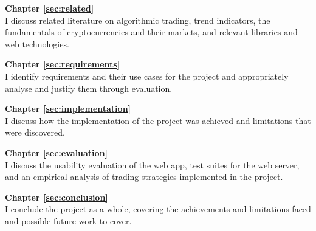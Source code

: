 \noindent\textbf{Chapter \ref{sec:related}} \\[0.2em]
I discuss related literature on algorithmic trading, trend indicators, the fundamentals of cryptocurrencies and their markets, and relevant libraries and web technologies.

\noindent\textbf{Chapter \ref{sec:requirements}} \\[0.2em]
I identify requirements and their use cases for the project and appropriately analyse and justify them through evaluation.

\noindent\textbf{Chapter \ref{sec:implementation}} \\[0.2em]
I discuss how the implementation of the project was achieved and limitations that were discovered.

\noindent\textbf{Chapter \ref{sec:evaluation}} \\[0.2em]
I discuss the usability evaluation of the web app, test suites for the web server, and an empirical analysis of trading strategies implemented in the project.

\noindent\textbf{Chapter \ref{sec:conclusion}} \\[0.2em]
I conclude the project as a whole, covering the achievements and limitations faced and possible future work to cover.
